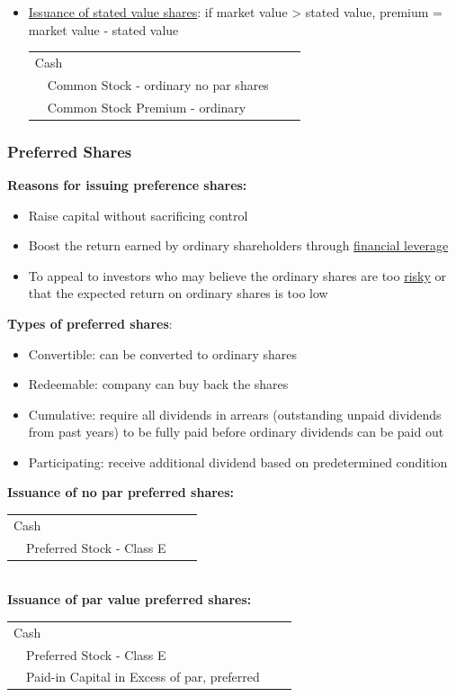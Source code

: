 \documentclass{article}
\begin{document}
\begin{multicols}{2}
\begin{itemize}
\begin{tabular}{llll}
	\end{tabular}\vspace{0.5em}\\
\item \underline{Issuance of stated value shares}: if market value > stated value, premium = market value - stated value \vspace{0.5em}\\
\begin{tabular}{llll}
	\multicolumn{4}{l}{Cash}\\
	& Common Stock - ordinary no par shares& &\\
	& Common Stock Premium - ordinary
\end{tabular}
\end{itemize}

\subsubsection{Preferred Shares}
\textbf{Reasons for issuing preference shares:}
\begin{itemize}
	\item Raise capital without sacrificing control
	\item Boost the return earned by ordinary shareholders through \underline{financial leverage}
	\item To appeal to investors who may believe the ordinary shares are too \underline{risky} or that the expected return on ordinary shares is too low
\end{itemize}
\textbf{Types of preferred shares}:
\begin{itemize}
	\item Convertible: can be converted to ordinary shares
	\item Redeemable: company can buy back the shares
	\item Cumulative: require all dividends in arrears (outstanding unpaid dividends from past years) to be fully paid before ordinary dividends can be paid out
	\item Participating: receive additional dividend based on predetermined condition
\end{itemize}
\textbf{Issuance of no par preferred shares:}\vspace{0.5em}\\
\begin{tabular}{llll}
	\multicolumn{4}{l}{Cash}\\
	& Preferred Stock - Class E& &\\
\end{tabular}\vspace{0.5em}\\
\textbf{Issuance of par value preferred shares:}\vspace{0.5em}\\
\begin{tabular}{llll}
	\multicolumn{4}{l}{Cash}\\
	& Preferred Stock - Class E& &\\
	& Paid-in Capital in Excess of par, preferred
\end{tabular}\vspace{0.5em}\\


\end{multicols}
\end{document}

